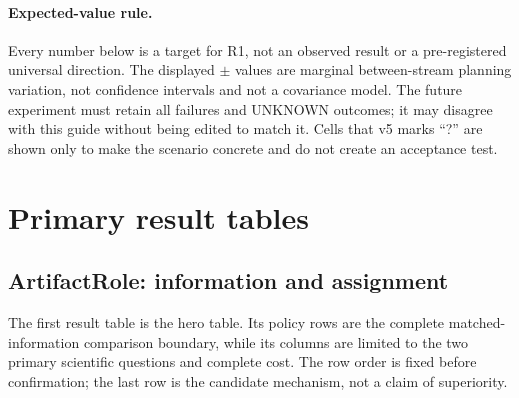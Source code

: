 \documentclass[sigconf,anonymous]{aamas}
\begin{document}
\paragraph{Expected-value rule.} Every number below is a target for R1, not an observed result or a pre-registered universal direction. The displayed $\pm$ values are marginal between-stream planning variation, not confidence intervals and not a covariance model. The future experiment must retain all failures and UNKNOWN outcomes; it may disagree with this guide without being edited to match it. Cells that v5 marks ``?'' are shown only to make the scenario concrete and do not create an acceptance test.

\section{Primary result tables}

\subsection{ArtifactRole: information and assignment}

The first result table is the hero table. Its policy rows are the complete matched-information comparison boundary, while its columns are limited to the two primary scientific questions and complete cost. The row order is fixed before confirmation; the last row is the candidate mechanism, not a claim of superiority.
\end{document}
